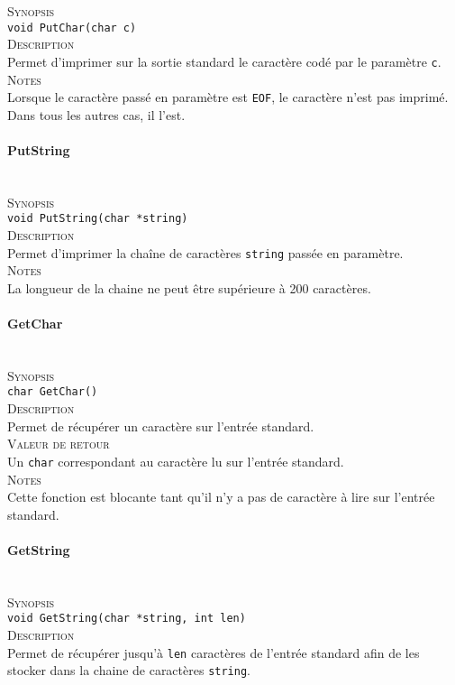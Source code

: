 \documentclass{report}
\newcommand{\myparagraph}[1]{\paragraph*{#1}\mbox{}\\}
\begin{document}
\textsc{Synopsis}\\
	\texttt{void PutChar(char c)}\\
	
\textsc{Description}\\
	Permet d'imprimer sur la sortie standard le caractère codé par le paramètre \texttt{c}.\\
	
\textsc{Notes}\\
	Lorsque le caractère passé en paramètre est \texttt{EOF}, le caractère n'est pas imprimé. Dans tous les autres cas, il l'est.




\myparagraph{PutString}

\textsc{Synopsis}\\
	\texttt{void PutString(char *string)}\\
	
\textsc{Description}\\
	Permet d'imprimer la chaîne de caractères \texttt{string} passée en paramètre.\\
	
\textsc{Notes}\\
	La longueur de la chaine ne peut être supérieure à 200 caractères.


\myparagraph{GetChar}

\textsc{Synopsis}\\
	\texttt{char GetChar()}\\
	
\textsc{Description}\\
	Permet de récupérer un caractère sur l'entrée standard.\\
	
\textsc{Valeur de retour}\\
	Un \texttt{char} correspondant au caractère lu sur l'entrée standard.\\
	
\textsc{Notes}\\
	Cette fonction est blocante tant qu'il n'y a pas de caractère à lire sur l'entrée standard.
	



\myparagraph{GetString}

\textsc{Synopsis}\\
	\texttt{void GetString(char *string, int len)}\\
	
\textsc{Description}\\
	Permet de récupérer jusqu'à \texttt{len} caractères de l'entrée standard afin de les stocker dans la chaine de caractères \texttt{string}.\\
	
\end{document}
